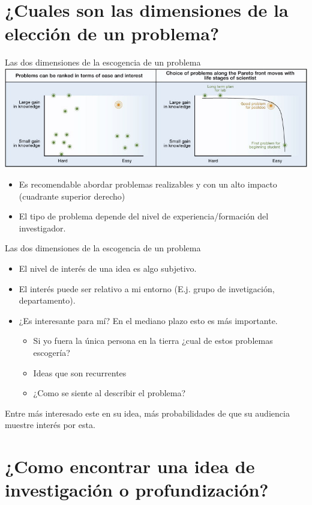 \documentclass [xcolor=svgnames, t] {beamer}
\begin{document}
\section{¿Cuales son las dimensiones de la elecci\'on de un problema?}
\begin{frame}{Las dos dimensiones de la escogencia de un problema}
\includegraphics[width=\textwidth]{fig3_2}
\begin{itemize}
\item \alert{Es recomendable abordar problemas realizables y con un alto impacto (cuadrante superior derecho)}
\item El tipo de problema depende del nivel de experiencia/formaci\'on del investigador.
\end{itemize}
\end{frame}

\begin{frame}{Las dos dimensiones de la escogencia de un problema}
\begin{itemize}
\item El nivel de inter\'es de una idea es algo subjetivo.
\item El inter\'es puede ser relativo a mi entorno (E.j. grupo de invetigaci\'on, departamento).
\item \alert{¿Es interesante para m\'i? En el mediano plazo esto es m\'as importante.}
\begin{itemize}
\item Si yo fuera la \'unica persona en la tierra ¿cual de estos problemas escoger\'ia?
\item Ideas que son recurrentes
\item ¿Como se siente al describir el problema?
\end{itemize}
\end{itemize}
\centering
\alert{Entre m\'as interesado este en su idea, m\'as probabilidades de que su audiencia muestre inter\'es por esta.}
\end{frame}

\section{¿Como encontrar una idea de investigaci\'on o profundizaci\'on?}
\end{document}
